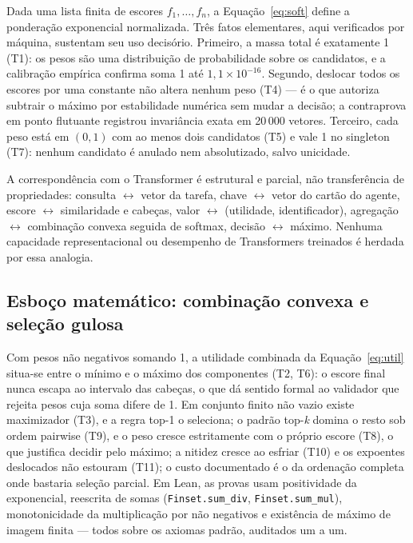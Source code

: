 \documentclass[12pt,a4paper]{article}
\begin{document}
Dada uma lista finita de escores $f_1,\dots,f_n$, a Equação~\ref{eq:soft}
define a ponderação exponencial normalizada. Três fatos elementares,
aqui verificados por máquina, sustentam seu uso decisório. Primeiro, a massa
total é exatamente 1 (T1): os pesos são uma distribuição de probabilidade
sobre os candidatos, e a calibração empírica confirma soma 1 até
$1{,}1\times10^{-16}$. Segundo, deslocar todos os escores por uma constante
não altera nenhum peso (T4) --- é o que autoriza subtrair o máximo por
estabilidade numérica sem mudar a decisão; a contraprova em ponto flutuante
registrou invariância exata em 20\,000 vetores. Terceiro, cada peso está em
$(0,1)$ com ao menos dois candidatos (T5) e vale 1 no singleton (T7): nenhum
candidato é anulado nem absolutizado, salvo unicidade.

A correspondência com o Transformer é estrutural e parcial, não transferência
de propriedades: consulta $\leftrightarrow$ vetor da tarefa, chave
$\leftrightarrow$ vetor do cartão do agente, escore $\leftrightarrow$
similaridade e cabeças, valor $\leftrightarrow$ (utilidade, identificador),
agregação $\leftrightarrow$ combinação convexa seguida de softmax, decisão
$\leftrightarrow$ máximo. Nenhuma capacidade representacional ou desempenho
de Transformers treinados é herdada por essa analogia.

\subsection{Esboço matemático: combinação convexa e seleção gulosa}

Com pesos não negativos somando 1, a utilidade combinada da
Equação~\ref{eq:util} situa-se entre o mínimo e o máximo dos componentes
(T2, T6): o escore final nunca escapa ao intervalo das cabeças, o que dá
sentido formal ao validador que rejeita pesos cuja soma difere de 1. Em
conjunto finito não vazio existe maximizador (T3), e a regra top-1 o
seleciona; o padrão top-\textit{k} domina o resto sob ordem pairwise (T9), e
o peso cresce estritamente com o próprio escore (T8), o que justifica decidir
pelo máximo; a nitidez cresce ao esfriar (T10) e os expoentes deslocados não
estouram (T11); o custo documentado é o da ordenação completa onde bastaria
seleção parcial. Em Lean, as provas usam positividade da exponencial,
reescrita de somas (\texttt{Finset.sum\_div}, \texttt{Finset.sum\_mul}),
monotonicidade da multiplicação por não negativos e existência de máximo de
imagem finita --- todos sobre os axiomas padrão, auditados um a um.
\end{document}
